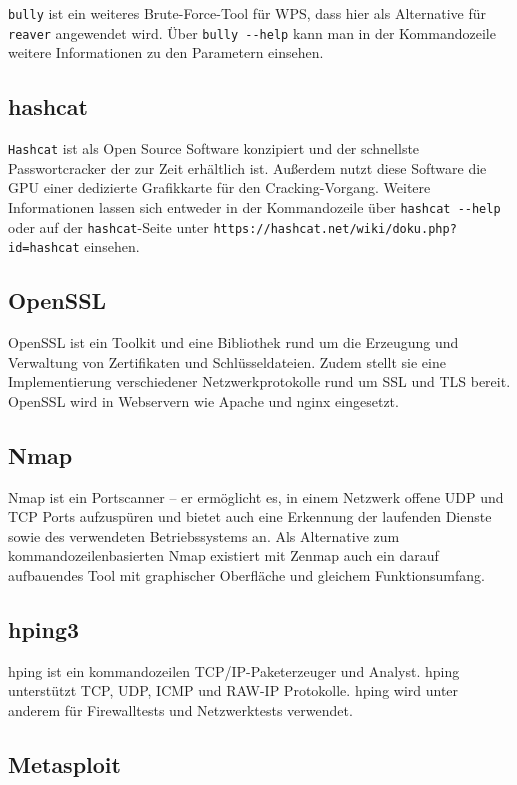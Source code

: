 \colorbox{altgray}{\lstinline|bully|} ist ein weiteres Brute-Force-Tool für WPS, dass hier als Alternative für \colorbox{altgray}{\lstinline|reaver|} angewendet wird. Über \colorbox{altgray}{\lstinline|bully --help|} kann man in der Kommandozeile weitere Informationen zu den Parametern einsehen.

\subsection{hashcat}
\colorbox{altgray}{\lstinline|Hashcat|} ist als Open Source Software konzipiert und der schnellste Passwortcracker der zur Zeit erhältlich ist. Außerdem nutzt diese Software die GPU einer dedizierte Grafikkarte für den Cracking-Vorgang. Weitere Informationen lassen sich entweder in der Kommandozeile über \colorbox{altgray}{\lstinline|hashcat --help|} oder auf der \colorbox{altgray}{\lstinline|hashcat|}-Seite unter \colorbox{altgray}{\lstinline|https://hashcat.net/wiki/doku.php?id=hashcat|} einsehen.

\subsection{OpenSSL}
OpenSSL ist ein Toolkit und eine Bibliothek rund um die Erzeugung und Verwaltung von Zertifikaten und Schlüsseldateien. Zudem stellt sie eine Implementierung verschiedener Netzwerkprotokolle rund um SSL und TLS bereit. OpenSSL wird in Webservern wie Apache und nginx eingesetzt.

\subsection{Nmap}
Nmap ist ein Portscanner -- er ermöglicht es, in einem Netzwerk offene UDP und TCP Ports aufzuspüren und bietet auch eine Erkennung der laufenden Dienste sowie des verwendeten Betriebssystems an. Als Alternative zum kommandozeilenbasierten Nmap existiert mit Zenmap auch ein darauf aufbauendes Tool mit graphischer Oberfläche und gleichem Funktionsumfang.

\subsection{hping3}
hping ist ein kommandozeilen TCP/IP-Paketerzeuger und Analyst. hping unterstützt TCP, UDP, ICMP und RAW-IP Protokolle. hping wird unter anderem für Firewalltests und Netzwerktests verwendet.

\subsection{Metasploit}

